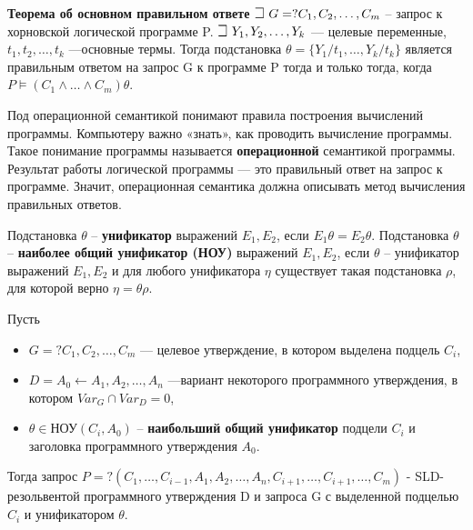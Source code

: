 \textbf{Теорема об основном правильном ответе}
$\mathLet ~ G =?C_{1},C_{2},\ldots,C_{m}$ -- запрос к хорновской логической программе P. $\mathLet ~ Y_{1},Y_{2},\ldots,Y_{k}$ — целевые переменные, $t_{1},t_{2},\ldots,t_{k}$ —основные термы.
Тогда подстановка $\theta = \{Y_{1}/t_{1}, \ldots, Y_{k}/t_{k}\}$ является правильным ответом на запрос G к программе P тогда и только тогда, когда $P \models (C_{1} \wedge \ldots \wedge C_{m})\theta$.

Под операционной семантикой понимают правила построения вычислений программы. Компьютеру важно «знать», как проводить вычисление программы. Такое понимание программы называется \textbf{операционной} семантикой программы. Результат работы логической программы --- это правильный ответ на запрос к программе. Значит, операционная семантика должна описывать метод вычисления правильных ответов.

Подстановка $\theta$ -- \textbf{унификатор} выражений $E_1, E_2$, если $E_1 \theta = E_2 \theta$. Подстановка $\theta$ -- \textbf{наиболее общий унификатор (НОУ)} выражений $E_1, E_2$, если $\theta$ -- унификатор выражений $E_1, E_2$ и для любого унификатора $\eta$ существует такая подстановка $\rho$, для которой верно $\eta = \theta \rho$.

Пусть 
\begin{itemize}
    \item $G = ? C_{1},C_{2},\ldots,C_{m}$ — целевое утверждение, в котором выделена подцель $C_{i}$,
    \item $D = A_{0} \leftarrow A_{1},A_{2},\ldots,A_{n}$ —вариант некоторого
программного утверждения, в котором $Var_{G} \cap Var_{D} = 0$,
    \item $\theta \in \text{НОУ}(C_{i},A_{0})$ -- \textbf{наибольший общий унификатор} подцели $C_{i}$ и заголовка программного утверждения $A_{0}$.
\end{itemize}
Тогда запрос 
$P = ?(C_{1},\ldots,C_{i-1}, A_{1} ,A_{2},\ldots,A_{n},C_{i+1},\ldots,C_{i+1},\ldots,C_{m})$ - SLD-резольвентой программного утверждения D и запроса G с выделенной подцелью $C_{i}$ и унификатором $\theta$. 

